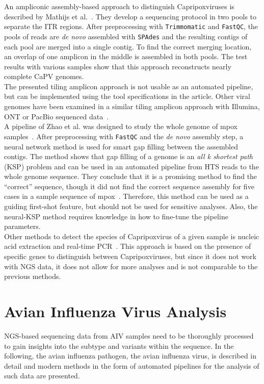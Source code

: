 An ampliconic assembly-based approach to distinguish Capripoxviruses is described by Mathijs et al.~\cite{mathijs2022robust}. They develop a sequencing protocol in two pools to separate the \ac{ITR} regions. After preprocessing with \texttt{Trimmomatic} and \texttt{FastQC}, the pools of reads are \textit{de novo} assembled with \texttt{SPAdes} and the resulting contigs of each pool are merged into a single contig. To find the correct merging location, an overlap of one amplicon in the middle is assembled in both pools. The test results with various samples show that this approach reconstructs nearly complete \acs{CaPV} genomes. \\
The presented tiling amplicon approach is not usable as an automated pipeline, but can be implemented using the tool specifications in the article. Other viral genomes have been examined in a similar tiling amplicon approach with Illumina, \ac{ONT} or PacBio sequenced data~\cite{grubaugh2019amplicon, freed2020rapid, gardner2014multiplex, quick2017multiplex}. \\
A pipeline of Zhao et al. was designed to study the whole genome of mpox samples~\cite{zhao2016finishing}. After preprocessing with \texttt{FastQC} and the \textit{de novo} assembly step, a neural network method is used for smart gap filling between the assembled contigs. The method shows that gap filling of a genome is an \textit{all k shortest path} (KSP) problem and can be used in an automated pipeline from \ac{HTS} reads to the whole genome sequence. They conclude that it is a promising method to find the ``correct'' sequence, though it did not find the correct sequence assembly for five cases in a sample sequence of mpox~\cite{zhao2016finishing}. Therefore, this method can be used as a guiding first-shot feature, but should not be used for sensitive analyses. Also, the neural-\acs{KSP} method requires knowledge in how to fine-tune the pipeline parameters. \\
Other methods to detect the species of Capripoxvirus of a given sample is nucleic acid extraction and real-time \ac{PCR}~\cite{armson2017detection}. This approach is based on the presence of specific genes to distinguish between Capripoxviruses, but since it does not work with \ac{NGS} data, it does not allow for more analyses and is not comparable to the previous methods.

\section{Avian Influenza Virus Analysis}\label{sec:AIV}
\ac{NGS}-based sequencing data from \ac{AIV} samples need to be thoroughly processed to gain insights into the subtype and variants within the sequence. In the following, the avian influenza pathogen, the avian influenza virus, is described in detail and modern methods in the form of automated pipelines for the analysis of such data are presented.

